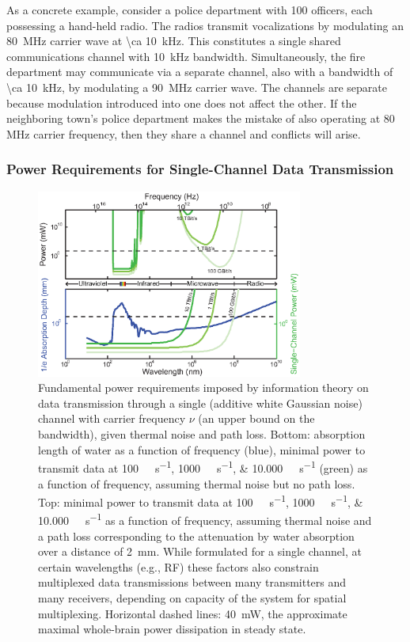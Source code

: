 As a concrete example, consider a police department with \num{100} officers, each possessing a hand-held radio.
The radios transmit vocalizations by modulating an \SI{80}{\mega\hertz} carrier wave at \SI{\ca 10}{\kilo\hertz}.
This constitutes a single shared communications channel with \SI{10}{\kilo\hertz} bandwidth.
Simultaneously, the fire department may communicate via a separate channel, also with a bandwidth of \SI{\ca 10}{\kilo\hertz}, by modulating a \SI{90}{\mega\hertz} carrier wave.
The channels are separate because modulation introduced into one does not affect the other.
If the neighboring town's police department makes the mistake of also operating at 80 MHz carrier frequency, then they share a channel and conflicts will arise.

\subsubsection{Power Requirements for Single-Channel Data Transmission}

\begin{figure}[htbp]
\caption{%
Fundamental power requirements imposed by information theory on data transmission through a single (additive white Gaussian noise) channel with carrier frequency $\nu$ (an upper bound on the bandwidth), given thermal noise and path loss.
Bottom: absorption length of water as a function of frequency (blue), minimal power to transmit data at \SIlist{100;1000;10,000}{\giga\bit\per\second} (green) as a function of frequency, assuming thermal noise but no path loss.
Top: minimal power to transmit data at \SIlist{100;1000;10,000}{\giga\bit\per\second} as a function of frequency, assuming thermal noise and a path loss corresponding to the attenuation by water absorption over a distance of \SI{2}{\milli\meter}.
While formulated for a single channel, at certain wavelengths (e.g., RF) these factors also constrain multiplexed data transmissions between many transmitters and many receivers, depending on capacity of the system for spatial multiplexing.
Horizontal dashed lines: \SI{40}{\milli\watt}, the approximate maximal whole-brain power dissipation in steady state.
}
\label{fig:rfpower}
\centering
\includegraphics[width=0.78\textwidth]{figs/Fig5.eps}
\end{figure}

